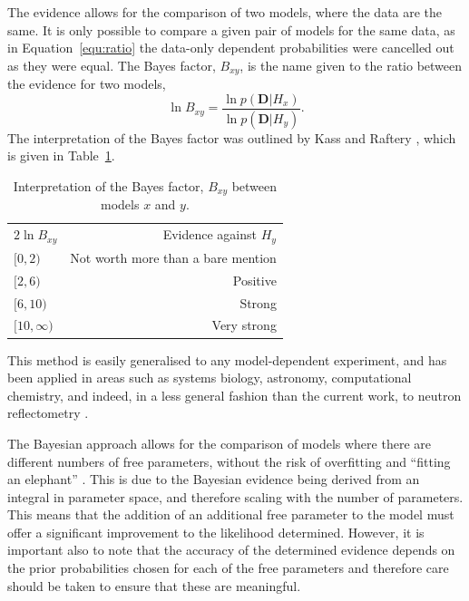 \documentclass[%
 reprint,
 superscriptaddress,
 amsmath,amssymb,
 aps,
]{revtex4-1}
\begin{document}
The evidence allows for the comparison of two models, where the data are the same.
It is only possible to compare a given pair of models for the same data, as in Equation~\ref{equ:ratio} the data-only dependent probabilities were cancelled out as they were equal. 
The Bayes factor, $B_{xy}$, is the name given to the ratio between the evidence for two models, 
%
\begin{equation}
    \ln{B_{xy}} = \frac{\ln{p(\bm{D}|H_x)}}{\ln{p(\bm{D}|H_y)}}. 
\end{equation}
The interpretation of the Bayes factor was outlined by Kass and Raftery \cite{kass_bayes_1995}, which is given in Table~\ref{tab:kass}.
%
\begin{table}
\caption{\label{tab:kass} Interpretation of the Bayes factor, $B_{xy}$ between models $x$ and $y$.}
\begin{ruledtabular}
\begin{tabular}{lr}
\textrm{$2\ln{B_{xy}}$} & Evidence against $H_y$\\
\colrule
$[0, 2)$ & Not worth more than a bare mention \\
$[2, 6)$ & Positive \\
$[6, 10)$ & Strong \\
$[10, \infty)$ & Very strong \\
\end{tabular}
\end{ruledtabular}
\end{table}
%
This method is easily generalised to any model-dependent experiment, and has been applied in areas such as systems biology, astronomy, computational chemistry, and indeed, in a less general fashion than the current work, to neutron reflectometry \cite{pullen_bayesian_2014,cornish_tests_2007,ensign_bayesian_2010,sivia_bayesian_1998}. 

The Bayesian approach allows for the comparison of models where there are different numbers of free parameters, without the risk of overfitting and ``fitting an elephant'' \cite{mayer_drawing_2010}.
This is due to the Bayesian evidence being derived from an integral in parameter space, and therefore scaling with the number of parameters. 
This means that the addition of an additional free parameter to the model must offer a significant improvement to the likelihood determined.
However, it is important also to note that the accuracy of the determined evidence depends on the prior probabilities chosen for each of the free parameters and therefore care should be taken to ensure that these are meaningful. 
\end{document}
